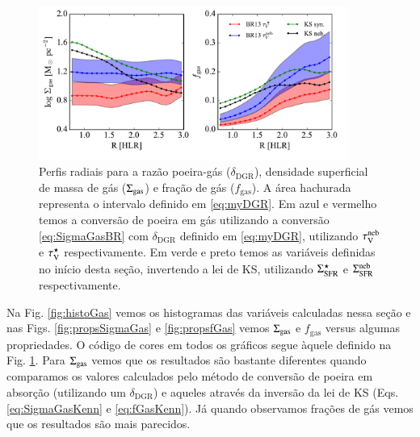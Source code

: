 \begin{figure}
	\centering
	\includegraphics[width=0.9\textwidth]{figuras/gas_R.pdf}
	\caption[Perfis radiais de $\SigmaGas$ e $f_{\mathrm{gas}}$]
	{Perfis radiais para a razão poeira-gás ($\delta_{\mathrm{DGR}}$), densidade superficial de massa
de gás ($\SigmaGas$) e fração de gás ($f_{\mathrm{gas}}$). A área hachurada representa o intervalo
definido em \eqref{eq:myDGR}. Em azul e vermelho temos a conversão de poeira em gás utilizando a
conversão \eqref{eq:SigmaGasBR} com $\delta_{\mathrm{DGR}}$ definido em \eqref{eq:myDGR},
utilizando $\tau_{\mathrm{V}}^{\mathrm{neb}}$ e $\tau_{\mathrm{V}}^\star$ respectivamente. Em verde e preto temos as variáveis definidas no
início desta seção, invertendo a lei de KS, utilizando $\Sigma_{\mathrm{SFR}}^\star$ e $\Sigma_{\mathrm{SFR}}^{\mathrm{neb}}$ respectivamente.}
	\label{fig:propsGasR}
\end{figure}

Na Fig. \ref{fig:histoGas} vemos os histogramas das variáveis calculadas nessa seção e nas Figs.
\ref{fig:propsSigmaGas} e \ref{fig:propsfGas} vemos $\SigmaGas$ e $f_{\mathrm{gas}}$ versus algumas
propriedades. O código de cores em todos os gráficos segue àquele definido na Fig.
\ref{fig:propsGasR}. Para $\SigmaGas$ vemos que os resultados são bastante diferentes quando
comparamos os valores calculados pelo método de conversão de poeira em absorção (utilizando um
$\delta_{\mathrm{DGR}}$) e aqueles através da inversão da lei de KS (Eqs. \ref{eq:SigmaGasKenn} e
\ref{eq:fGasKenn}). Já quando observamos frações de gás vemos que os resultados são mais
parecidos.

